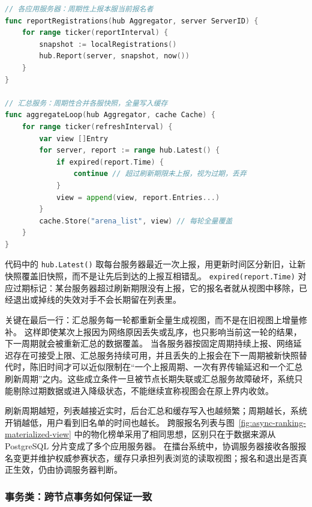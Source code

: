 \begin{tcolorbox}[title=跨服报名列表的异步汇总流程]
\begin{lstlisting}[style=codeblock, language=go]
// 各应用服务器：周期性上报本服当前报名者
func reportRegistrations(hub Aggregator, server ServerID) {
    for range ticker(reportInterval) {
        snapshot := localRegistrations()
        hub.Report(server, snapshot, now())
    }
}

// 汇总服务：周期性合并各服快照，全量写入缓存
func aggregateLoop(hub Aggregator, cache Cache) {
    for range ticker(refreshInterval) {
        var view []Entry
        for server, report := range hub.Latest() {
            if expired(report.Time) {
                continue // 超过刷新期限未上报，视为过期，丢弃
            }
            view = append(view, report.Entries...)
        }
        cache.Store("arena_list", view) // 每轮全量覆盖
    }
}
\end{lstlisting}
\end{tcolorbox}

代码中的 \texttt{hub.Latest()} 取每台服务器最近一次上报，用更新时间区分新旧，让新快照覆盖旧快照，而不是让先后到达的上报互相错乱。
\texttt{expired(report.Time)} 对应过期标记：某台服务器超过刷新期限没有上报，它的报名者就从视图中移除，已经退出或掉线的失效对手不会长期留在列表里。

关键在最后一行：汇总服务每一轮都重新全量生成视图，而不是在旧视图上增量修补。
这样即使某次上报因为网络原因丢失或乱序，也只影响当前这一轮的结果，下一周期就会被重新汇总的数据覆盖。
当各服务器按固定周期持续上报、网络延迟存在可接受上限、汇总服务持续可用，并且丢失的上报会在下一周期被新快照替代时，陈旧时间才可以近似限制在“一个上报周期、一次有界传输延迟和一个汇总刷新周期”之内。这些成立条件一旦被节点长期失联或汇总服务故障破坏，系统只能剔除过期数据或进入降级状态，不能继续宣称视图会在原上界内收敛。

刷新周期越短，列表越接近实时，后台汇总和缓存写入也越频繁；周期越长，系统开销越低，用户看到旧名单的时间也越长。
跨服报名列表与图~\ref{fig:async-ranking-materialized-view} 中的物化榜单采用了相同思想，区别只在于数据来源从 PostgreSQL 分片变成了多个应用服务器。
在擂台系统中，协调服务器接收各服报名变更并维护权威参赛状态，缓存只承担列表浏览的读取视图；报名和退出是否真正生效，仍由协调服务器判断。

\subsubsection{事务类：跨节点事务如何保证一致}\label{sec4:cross-server-arena}

